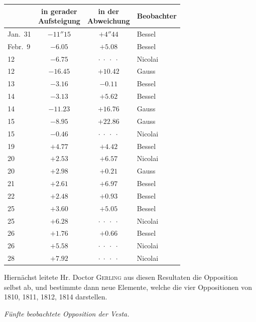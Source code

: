 \begin{center}\fontsize{10}{12}\selectfont\setlength{\tabcolsep}{6pt}\renewcommand{\arraystretch}{1.15}\begin{tabular}{l|c|c|l}
& \shortstack{in gerader\\Aufsteigung} & \shortstack{in der\\Abweichung} & Beobachter \\
\hline
Jan.\ 31 & $-11''15$ & $+4''44$  & Bessel \\
Febr.\ 9 & $-6.05$   & $+5.08$   & Bessel \\
12       & $-6.75$   & $\cdot\;\cdot\;\cdot\;\cdot$ & Nicolai \\
12       & $-16.45$  & $+10.42$  & Gauss \\
13       & $-3.16$   & $-0.11$   & Bessel \\
14       & $-3.13$   & $+5.62$   & Bessel \\
14       & $-11.23$  & $+16.76$  & Gauss \\
15       & $-8.95$   & $+22.86$  & Gauss \\
15       & $-0.46$   & $\cdot\;\cdot\;\cdot\;\cdot$ & Nicolai \\
19       & $+4.77$   & $+4.42$   & Bessel \\
20       & $+2.53$   & $+6.57$   & Nicolai \\
20       & $+2.98$   & $+0.21$   & Gauss \\
21       & $+2.61$   & $+6.97$   & Bessel \\
22       & $+2.48$   & $+0.93$   & Bessel \\
25       & $+3.60$   & $+5.05$   & Bessel \\
25       & $+6.28$   & $\cdot\;\cdot\;\cdot\;\cdot$ & Nicolai \\
26       & $+1.76$   & $+0.66$   & Bessel \\
26       & $+5.58$   & $\cdot\;\cdot\;\cdot\;\cdot$ & Nicolai \\
28       & $+7.92$   & $\cdot\;\cdot\;\cdot\;\cdot$ & Nicolai \\
\end{tabular}\end{center}

\par\indent Hiernächst leitete Hr. Doctor \textsc{Gerling} aus diesen Resultaten die Opposition selbst
ab, und bestimmte dann neue Elemente, welche die vier Oppositionen von 1810, 1811, 1812,
1814 darstellen.

\emph{Fünfte beobachtete Opposition der Vesta.}

